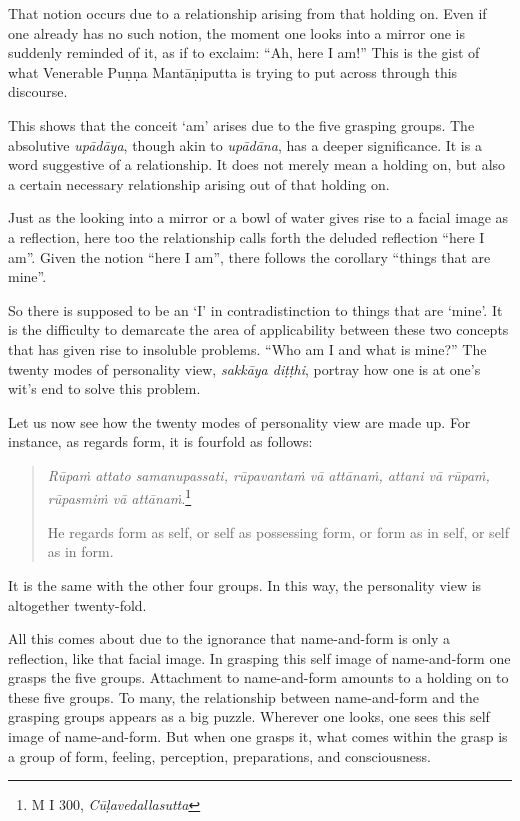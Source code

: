 That notion occurs due to a relationship arising from that holding on. Even if one already has no such notion, the moment one looks into a mirror one is suddenly reminded of it, as if to exclaim: ``Ah, here I am!'' This is the gist of what Venerable Puṇṇa Mantāṇiputta is trying to put across through this discourse.

This shows that the conceit `am' arises due to the five grasping groups. The absolutive \emph{upādāya}, though akin to \emph{upādāna}, has a deeper significance. It is a word suggestive of a relationship. It does not merely mean a holding on, but also a certain necessary relationship arising out of that holding on.

Just as the looking into a mirror or a bowl of water gives rise to a facial image as a reflection, here too the relationship calls forth the deluded reflection ``here I am''. Given the notion ``here I am'', there follows the corollary ``things that are mine''.

So there is supposed to be an `I' in contradistinction to things that are `mine'. It is the difficulty to demarcate the area of applicability between these two concepts that has given rise to insoluble problems. ``Who am I and what is mine?'' The twenty modes of personality view, \emph{sakkāya diṭṭhi}, portray how one is at one's wit's end to solve this problem.

Let us now see how the twenty modes of personality view are made up. For instance, as regards form, it is fourfold as follows:

\begin{quote}
\emph{Rūpaṁ attato samanupassati, rūpavantaṁ vā attānaṁ, attani vā rūpaṁ, rūpasmiṁ vā attānaṁ}.\footnote{M I 300, \emph{Cūḷavedallasutta}}

He regards form as self, or self as possessing form, or form as in self, or self as in form.
\end{quote}

It is the same with the other four groups. In this way, the personality view is altogether twenty-fold.

All this comes about due to the ignorance that name-and-form is only a reflection, like that facial image. In grasping this self image of name-and-form one grasps the five groups. Attachment to name-and-form amounts to a holding on to these five groups. To many, the relationship between name-and-form and the grasping groups appears as a big puzzle. Wherever one looks, one sees this self image of name-and-form. But when one grasps it, what comes within the grasp is a group of form, feeling, perception, preparations, and consciousness.

